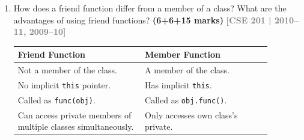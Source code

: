 \documentclass[12pt,a3paper]{article}
\newcommand{\yr}[1]{\hfill\textcolor{gray}{\small\textbf{[#1]}}}
\newcommand{\mk}[1]{\textcolor{orange!70!black}{\small\textbf{(#1 marks)}}}
\begin{document}
\begin{enumerate}
\begin{tcolorbox}
\textbf{Yes}, a member function of one class can be a friend of
another:

\begin{lstlisting}[language=C++]
#include <iostream>
using namespace std;

class Alpha;

class Beta {
public:
    void display(Alpha& a);  // will be friend of Alpha
};

class Alpha {
    int secret = 42;
    friend void Beta::display(Alpha&);  // member of Beta is friend
};

void Beta::display(Alpha& a) {
    cout << "Alpha's secret: " << a.secret << "\n";
}

int main() {
    Beta b; Alpha a;
    b.display(a);   // Alpha's secret: 42
    return 0;
}
\end{lstlisting}

\textbf{Key rules:} Forward declaration of \texttt{Alpha} before
\texttt{Beta}; \texttt{friend} names the specific member function;
definition of \texttt{Beta::display} after full definition of
\texttt{Alpha}.

\end{tcolorbox}

\item How does a friend function differ from a member of a class? What are the advantages of using friend functions? \mk{6+6+15}
\yr{CSE 201 | 2010--11, 2009--10}

\begin{tcolorbox}[enhanced,breakable,ansbox,colback=cD!4,colframe=cD,
  boxrule=0.8pt,arc=5pt,
  title={\textbf{Answer --- Friend vs member function; advantages}},
  fonttitle=\bfseries\color{white},colbacktitle=cD]

\begin{center}
\small
\begin{tabular}{@{}p{0.44\linewidth}p{0.44\linewidth}@{}}
\toprule
\textbf{Friend Function} & \textbf{Member Function} \\
\midrule
Not a member of the class. & A member of the class. \\[3pt]
No implicit \texttt{this} pointer. & Has implicit \texttt{this}. \\[3pt]
Called as \texttt{func(obj)}. & Called as \texttt{obj.func()}. \\[3pt]
Can access private members of
multiple classes simultaneously. &
Only accesses own class's private. \\
\bottomrule
\end{tabular}
\end{center}


\end{tcolorbox}
\end{enumerate}
\end{document}
